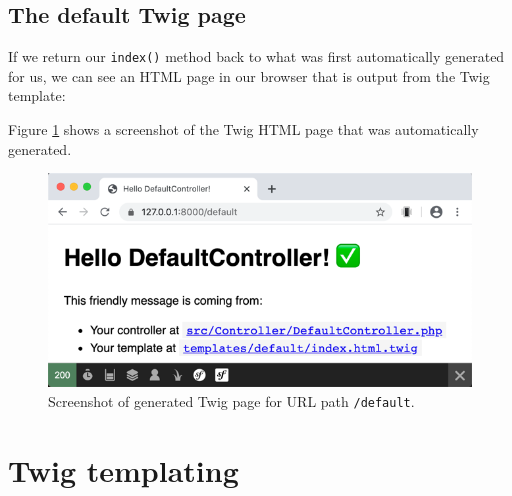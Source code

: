 \documentclass[a4paperpaper,openright]{book}
\newenvironment{Shaded}{}{}
\newcommand{\KeywordTok}[1]{\textcolor[rgb]{0.00,0.44,0.13}{\textbf{#1}}}
\newcommand{\NormalTok}[1]{#1}
\newcommand{\OtherTok}[1]{\textcolor[rgb]{0.00,0.44,0.13}{#1}}
\newcommand{\StringTok}[1]{\textcolor[rgb]{0.25,0.44,0.63}{#1}}
\begin{document}
\hypertarget{the-default-twig-page}{%
\section{The default Twig page}\label{the-default-twig-page}}

If we return our \texttt{index()} method back to what was first
automatically generated for us, we can see an HTML page in our browser
that is output from the Twig template:

\begin{Shaded}
\end{Shaded}

Figure \ref{generated_twig_default} shows a screenshot of the Twig HTML
page that was automatically generated.

\begin{figure}
\centering
\includegraphics{./tex2pdf.-65f13e14688ab55b/4e20ebf6b80bf441fbc12d17c09ac3680e146cf1.png}
\caption{Screenshot of generated Twig page for URL path
\texttt{/default}. \label{generated_twig_default}}
\end{figure}

\hypertarget{twig-templating}{%
\chapter{Twig templating}\label{twig-templating}}
\end{document}
